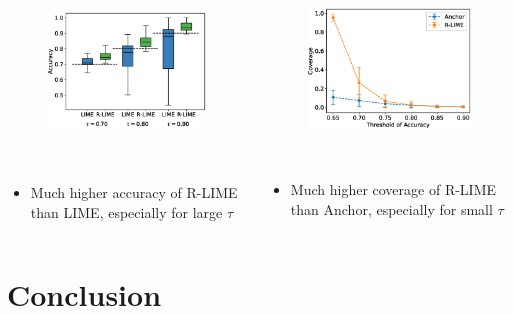 \documentclass[aspectratio=169]{slide-en}
\begin{document}
\begin{frame}{}
  \vspace{-1.5em}
  \begin{columns}[t]
    \begin{column}{0.48\textwidth}
      \begin{figure}
        \includegraphics[height=142pt]{box_plot}
      \end{figure}
      \begin{itemize}
        \item Much higher accuracy of R-LIME than LIME, especially for large $\tau$
      \end{itemize}
    \end{column}
    \begin{column}{0.48\textwidth}
      \begin{figure}
        \includegraphics[height=140pt]{comp_cov}
      \end{figure}
      \begin{itemize}
        \item Much higher coverage of R-LIME than Anchor, especially for small $\tau$
      \end{itemize}
    \end{column}
  \end{columns}
\end{frame}

\section{Conclusion}
\end{document}
